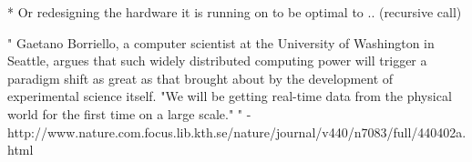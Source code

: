 \documentclass{article}
\begin{document}
    * Or redesigning the hardware it is running on to be optimal to .. (recursive
    call)


"
Gaetano Borriello, a computer scientist at the University of Washington in
Seattle, argues that such widely distributed computing power will trigger a
paradigm shift as great as that brought about by the development of
experimental science itself. "We will be getting real-time data from the
physical world for the first time on a large scale."
" - http://www.nature.com.focus.lib.kth.se/nature/journal/v440/n7083/full/440402a.html



%   
%      
%
%
%
%

    
    
\end{document}
